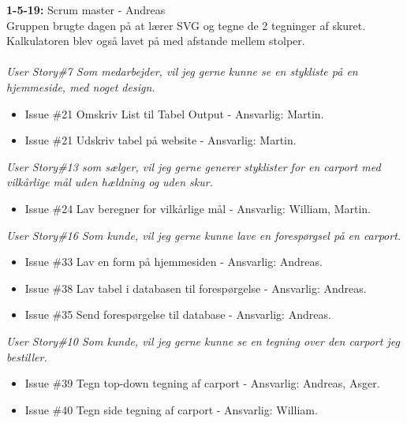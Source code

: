 \documentclass[11pt]{report}
\begin{document}
\noindent\textbf{1-5-19:} Scrum master - Andreas\\
Gruppen brugte dagen på at lærer SVG og tegne de 2 tegninger af skuret. Kalkulatoren blev også lavet på med afstande mellem stolper.\\\\
\textit{User Story\#7 Som medarbejder, vil jeg gerne kunne se en stykliste på en hjemmeside, med noget design.}
\begin{itemize}
\renewcommand\labelitemi{--}
\item Issue \#21 Omskriv List til Tabel Output - Ansvarlig: Martin.
\item Issue \#21 Udskriv tabel på website - Ansvarlig: Martin.
\end{itemize}
\textit{User Story\#13 som sælger, vil jeg gerne generer styklister for en carport med vilkårlige mål uden hældning og uden skur.}
\begin{itemize}
\renewcommand\labelitemi{--}
\item Issue \#24 Lav beregner for vilkårlige mål - Ansvarlig: William, Martin.
\end{itemize}
\textit{User Story\#16 Som kunde, vil jeg gerne kunne lave en forespørgsel på en carport.}
\begin{itemize}
\renewcommand\labelitemi{--}
\item Issue \#33 Lav en form på hjemmesiden - Ansvarlig: Andreas.
\item Issue \#38 Lav tabel i databasen til forespørgelse - Ansvarlig: Andreas.
\item Issue \#35 Send forespørgelse til database - Ansvarlig: Andreas.
\end{itemize}
\textit{User Story\#10 Som kunde, vil jeg gerne kunne se en tegning over den carport jeg bestiller.}
\begin{itemize}
\renewcommand\labelitemi{--}
\item Issue \#39 Tegn top-down tegning af carport - Ansvarlig: Andreas, Asger.
\item Issue \#40 Tegn side tegning af carport - Ansvarlig: William.
\end{itemize}
\end{document}
